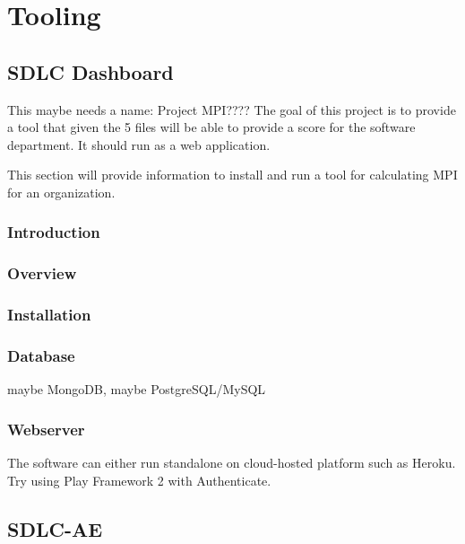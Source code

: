 \documentclass[SDSUThesis.tex]{subfiles}
\begin{document}
\section{Tooling}

\subsection{SDLC Dashboard}
This maybe needs a name: Project MPI????  The goal of this project is to provide a tool that
given the 5 files will be able to provide a score for the software department.  It should run 
as a web application.

This section will provide information to install and run a tool for calculating MPI for an organization.
\subsubsection{Introduction}
\subsubsection{Overview}
\subsubsection{Installation}
\subsubsection{Database}
maybe MongoDB, maybe PostgreSQL/MySQL
\subsubsection{Webserver}
The software can either run standalone on cloud-hosted platform such as Heroku.  Try using Play Framework 2 with Authenticate.

\subsection{SDLC-AE}
\end{document}
